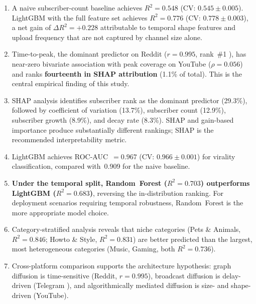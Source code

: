 \documentclass[journal,article,submit,pdftex,moreauthors]{Definitions/mdpi}
\begin{document}
\begin{enumerate}
\item A naive subscriber-count baseline achieves $R^2 = 0.548$
      (CV: $0.545 \pm 0.005$).
      LightGBM with the full feature set achieves $R^2 = 0.776$
      (CV: $0.778 \pm 0.003$), a net gain of $\Delta R^2 = +0.228$
      attributable to temporal shape features and upload frequency
      that are not captured by channel size alone.

\item Time-to-peak, the dominant predictor on Reddit ($r = 0.995$,
      rank~\#1 \cite{ref-paper1}), has near-zero bivariate association
      with peak coverage on YouTube ($\rho = 0.056$) and ranks
      \textbf{fourteenth in SHAP attribution} (1.1\% of total).
      This is the central empirical finding of this study.

\item SHAP analysis identifies subscriber rank as the dominant predictor
      (29.3\%), followed by coefficient of variation (13.7\%),
      subscriber count (12.9\%), subscriber growth (8.9\%), and
      decay rate (8.3\%).
      SHAP and gain-based importance produce substantially different
      rankings; SHAP is the recommended interpretability metric.

\item LightGBM achieves ROC-AUC~$= 0.967$ (CV: $0.966 \pm 0.001$)
      for virality classification, compared with~0.909 for the naive
      baseline.

\item \textbf{Under the temporal split, Random~Forest ($R^2 = 0.703$)
      outperforms LightGBM ($R^2 = 0.683$)}, reversing the in-distribution
      ranking.
      For deployment scenarios requiring temporal robustness,
      Random~Forest is the more appropriate model choice.

\item Category-stratified analysis reveals that niche categories
      (Pets \& Animals, $R^2 = 0.846$; Howto \& Style, $R^2 = 0.831$)
      are better predicted than the largest, most heterogeneous categories
      (Music, Gaming, both $R^2 = 0.736$).

\item Cross-platform comparison supports the architecture hypothesis:
      graph diffusion is time-sensitive (Reddit, $r = 0.995$),
      broadcast diffusion is delay-driven (Telegram \cite{ref-paper2}),
      and algorithmically mediated diffusion is size- and shape-driven
      (YouTube).
\end{enumerate}
\end{document}
